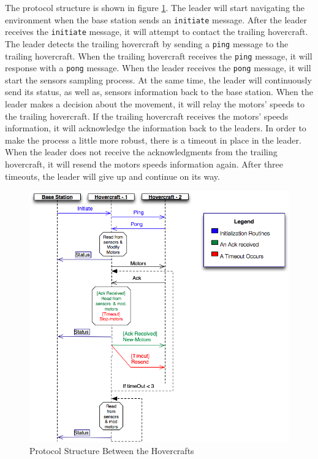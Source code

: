 The protocol structure is shown in figure \ref{fig:protocol}. The leader will
start navigating the environment when the base station sends an
\texttt{initiate} message. After the leader receives the \texttt{initiate}
message, it will attempt to contact the trailing hovercraft. The leader detects
the trailing hovercraft by sending a \texttt{ping} message to the trailing
hovercraft. When the trailing hovercraft receives the \texttt{ping} message, it
will response with a \texttt{pong} message. When the leader receives the
\texttt{pong} message, it will start the sensors sampling process. At the same
time, the leader will continuously send its status, as well as, sensors
information back to the base station. When the leader makes a decision about
the movement, it will relay the motors' speeds to the trailing hovercraft. If
the trailing hovercraft receives the motors' speeds information, it will
acknowledge the information back to the leaders. In order to make the process a
little more robust, there is a timeout in place in the leader. When the leader
does not receive the acknowledgments from the trailing hovercraft, it will
resend the motors speeds information again. After three timeouts, the leader
will give up and continue on its way.
\begin{figure}[thp]
  \begin{center}
    \includegraphics[width=130mm]{imageSources/messages.png}
  \end{center}
  \caption{Protocol Structure Between the Hovercrafts} 
  \label{fig:protocol}
\end{figure}

